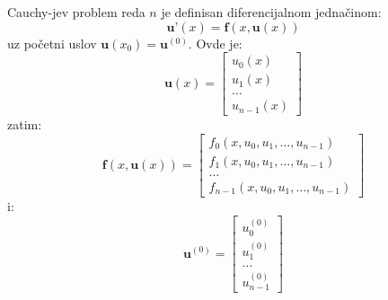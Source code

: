 \documentclass{slides}
\begin{document}
	
	Cauchy-jev problem reda $n$ je definisan diferencijalnom
	jedna\v{c}inom:
	\begin{displaymath}
	\mathbf{u}’(x)=\mathbf{f}(x,\mathbf{u}(x))
	\end{displaymath}
	uz po\v{c}etni uslov $\mathbf{u}(x_{0})=\mathbf{u}^{(0
		)}$.
	Ovde je:
	\begin{displaymath}
	\mathbf{u}(x)=\left[
	\begin{array}{c}
	u_{0}(x) \\
	u_{1}(x) \\
	\ldots \\
	u_{n-1}(x)
	\end{array}
	\right]
	\end{displaymath}
	zatim:
	\begin{displaymath}
	\mathbf{f}(x,\mathbf{u}(x))=\left[
	\begin{array}{c}
	f_{0}(x,u_{0},u_{1},\ldots,u_{n-1}) \\
	f_{1}(x,u_{0},u_{1},\ldots,u_{n-1}) \\
	\ldots \\
	f_{n-1}(x,u_{0},u_{1},\ldots,u_{n-1})
	\end{array}
	\right]
	\end{displaymath}
	i:
	\begin{displaymath}
	\mathbf{u}^{(0)}=\left[
	\begin{array}{c}
	u_{0}^{(0)} \\
	u_{1}^{(0)} \\
	\ldots \\
	u_{n-1}^{(0)}
	\end{array}
	\right]
	\end{displaymath}
\end{document}
